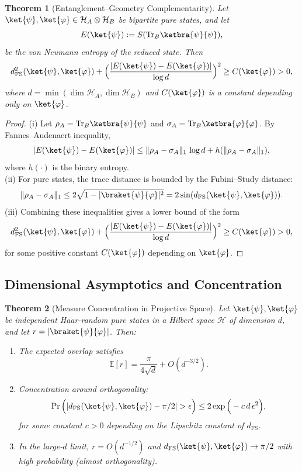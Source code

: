\documentclass[aps,pra,reprint,nofootinbib,showpacs,superscriptaddress]{revtex4-1}
\newtheorem{theorem}{Theorem}[section]
\newcommand{\Hilbert}{\mathcal{H}}
\begin{document}
\begin{theorem}[Entanglement–Geometry Complementarity]
\label{thm:uncertainty}
Let $\ket{\psi}, \ket{\varphi} \in \Hilbert_A \otimes \Hilbert_B$ be bipartite pure states, and let 
\[
E(\ket{\psi}) := S(\mathrm{Tr}_B \ketbra{\psi}{\psi}),
\] 
be the von Neumann entropy of the reduced state. Then
\[
d_{\text{FS}}^2(\ket{\psi},\ket{\varphi}) + \Big(\frac{|E(\ket{\psi}) - E(\ket{\varphi})|}{\log d}\Big)^2 \ge C(\ket{\varphi}) > 0,
\]
where $d = \min(\dim \Hilbert_A, \dim \Hilbert_B)$ and $C(\ket{\varphi})$ is a constant depending only on $\ket{\varphi}$.
\end{theorem}

\begin{proof}
(i) Let $\rho_A = \mathrm{Tr}_B \ketbra{\psi}{\psi}$ and $\sigma_A = \mathrm{Tr}_B \ketbra{\varphi}{\varphi}$. By Fannes–Audenaert inequality,
\[
|E(\ket{\psi}) - E(\ket{\varphi})| \le \|\rho_A - \sigma_A\|_1 \, \log d + h(\|\rho_A - \sigma_A\|_1),
\]
where $h(\cdot)$ is the binary entropy.\\
(ii) For pure states, the trace distance is bounded by the Fubini–Study distance:
\[
\|\rho_A - \sigma_A\|_1 \le 2 \sqrt{1 - |\braket{\psi}{\varphi}|^2} = 2 \sin(d_{\text{FS}}(\ket{\psi},\ket{\varphi})).
\]
(iii) Combining these inequalities gives a lower bound of the form
\[
d_{\text{FS}}^2(\ket{\psi},\ket{\varphi}) + \Big(\frac{|E(\ket{\psi}) - E(\ket{\varphi})|}{\log d}\Big)^2 \ge C(\ket{\varphi}) > 0,
\]
for some positive constant \(C(\ket{\varphi})\) depending on $\ket{\varphi}$.
\end{proof}

\subsection{Dimensional Asymptotics and Concentration}

\begin{theorem}[Measure Concentration in Projective Space]
\label{thm:concentration}
Let $\ket{\psi},\ket{\varphi}$ be independent Haar-random pure states in a Hilbert space $\Hilbert$ of dimension $d$, and let $r = |\braket{\psi}{\varphi}|$. Then:
\begin{enumerate}[label=(\roman*)]
    \item The expected overlap satisfies
    \[
    \mathbb{E}[r] = \frac{\pi}{4\sqrt{d}} + O(d^{-3/2}).
    \]
    \item Concentration around orthogonality:
    \[
    \Pr\Big(|d_{\text{FS}}(\ket{\psi},\ket{\varphi}) - \pi/2| > \epsilon\Big) 
    \le 2 \exp\Big(- c\, d\, \epsilon^2 \Big),
    \]
    for some constant $c>0$ depending on the Lipschitz constant of $d_{\text{FS}}$.
    \item In the large-$d$ limit, $r = O(d^{-1/2})$ and $d_{\text{FS}}(\ket{\psi},\ket{\varphi}) \to \pi/2$ with high probability (almost orthogonality).
\end{enumerate}
\end{theorem}
\end{document}
